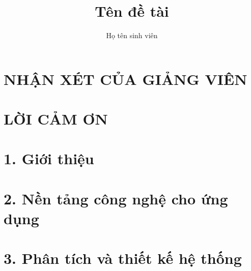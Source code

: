 \documentclass[a4paper,12pt,oneside]{report}
\title{Tên đề tài}						%
\author{Họ tên sinh viên}				%
\begin{document}


\chapter*{NHẬN XÉT CỦA GIẢNG VIÊN}


\chapter*{LỜI CẢM ƠN}


\tableofcontents
\listoffigures
\listoftables

\clearpage
{}			%
\chapter{1. Giới thiệu}

\chapter{2. Nền tảng công nghệ cho ứng dụng}


\chapter{3. Phân tích và thiết kế hệ thống}


{}

\end{document}
